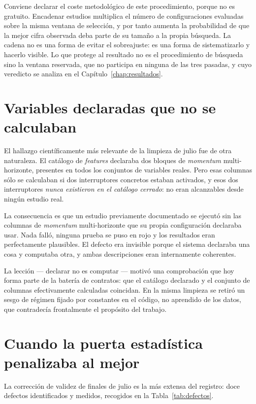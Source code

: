 Conviene declarar el coste metodológico de este procedimiento, porque no es gratuito. Encadenar
estudios multiplica el número de configuraciones evaluadas sobre la misma ventana de selección, y
por tanto aumenta la probabilidad de que la mejor cifra observada deba parte de su tamaño a la
propia búsqueda. La cadena no es una forma de evitar el sobreajuste: es una forma de sistematizarlo
y hacerlo visible. Lo que protege al resultado no es el procedimiento de búsqueda sino la ventana
reservada, que no participa en ninguna de las tres pasadas, y cuyo veredicto se analiza en el
Capítulo~\ref{chap:resultados}.

\section{Variables declaradas que no se calculaban}

El hallazgo científicamente más relevante de la limpieza de julio fue de otra naturaleza. El
catálogo de \textit{features} declaraba dos bloques de \textit{momentum} multi-horizonte, presentes
en todos los conjuntos de variables reales. Pero esas columnas sólo se calculaban si dos
interruptores concretos estaban activados, y esos dos interruptores \emph{nunca existieron en el
catálogo cerrado}: no eran alcanzables desde ningún estudio real.

La consecuencia es que un estudio previamente documentado se ejecutó sin las columnas de
\textit{momentum} multi-horizonte que su propia configuración declaraba usar. Nada falló, ninguna
prueba se puso en rojo y los resultados eran perfectamente plausibles. El defecto era invisible
porque el sistema declaraba una cosa y computaba otra, y ambas descripciones eran internamente
coherentes.

La lección --- declarar no es computar --- motivó una comprobación que hoy forma parte de la
batería de contratos: que el catálogo declarado y el conjunto de columnas efectivamente calculadas
coincidan. En la misma limpieza se retiró un sesgo de régimen fijado por constantes en el código, no
aprendido de los datos, que contradecía frontalmente el propósito del trabajo.

\section{Cuando la puerta estadística penalizaba al mejor}

La corrección de validez de finales de julio es la más extensa del registro: doce defectos
identificados y medidos, recogidos en la Tabla~\ref{tab:defectos}.

